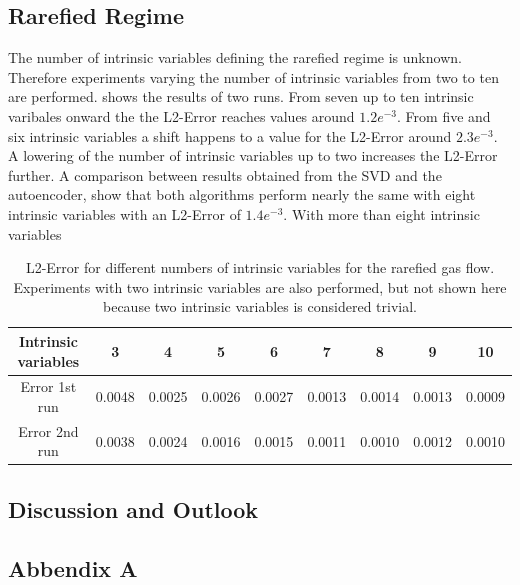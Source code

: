 \documentclass[12pt, a4paper]{article}
\begin{document}
\subsection{Rarefied Regime}
The number of intrinsic variables defining the rarefied regime is unknown. Therefore experiments varying the number of intrinsic variables from two to ten are performed.  shows the results of two runs. From seven up to ten intrinsic varibales onward the the L2-Error reaches values around \(1.2e^{-3}\). From five and six intrinsic variables a shift happens to a value for the L2-Error around \(2.3e^{-3}\). A lowering of the number of intrinsic variables up to two increases the L2-Error further. A comparison between results obtained from the SVD and the autoencoder, show that both algorithms perform nearly the same with eight intrinsic variables with an L2-Error of \(1.4e^{-3}\). With more than eight intrinsic variables  
\begin{table}[!htbp]\centering
	\begin{tabular}{ |c|c|c|c|c|c|c|c|c| }
		\hline
		Intrinsic variables  & 3 & 4 & 5 & 6 & 7 & 8 & 9 & 10 \\ [.5ex]
		\hline
		Error 1st run & 0.0048 & 0.0025 & 0.0026 & 0.0027 & 0.0013 & 0.0014 & 0.0013 & 0.0009\\ \hline
		Error 2nd run & 0.0038 & 0.0024 & 0.0016 & 0.0015 & 0.0011 & 0.0010 & 0.0012 & 0.0010\\\hline
	\end{tabular}
	\caption{L2-Error for different numbers of intrinsic variables for the rarefied gas flow. Experiments with two intrinsic variables are also performed, but not shown here because two intrinsic variables is considered trivial.}
	\label{Tab:Intrinsic units}
\end{table}
\subsection{Discussion and Outlook}
\newpage
{}

\newpage
\subsection{Abbendix A}\label{Sec:AppendixB}
\end{document}
